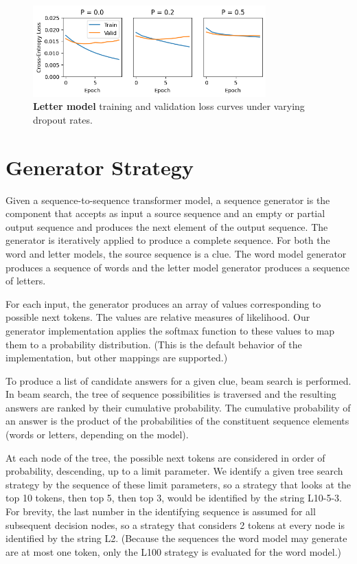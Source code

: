 \documentclass[letterpaper]{article} %
\begin{document}
\begin{NoHyper}
\begin{figure}
\centering
\includegraphics[width=0.8\textwidth]{fig-charmark-loss-dropout}
\caption{\textbf{Letter model} training and validation loss curves under varying dropout rates.}
\label{fig:charmark-loss-dropout}
\end{figure}



\section{Generator Strategy}
\label{sec:generator}

Given a sequence-to-sequence transformer model, a sequence generator is the component that accepts as input a source sequence and an empty or partial output sequence and produces the next element of the output sequence. The generator is iteratively applied to produce a complete sequence. For both the word and letter models, the source sequence is a clue. The word model generator produces a sequence of words and the letter model generator produces a sequence of letters.

For each input, the generator produces an array of values corresponding to possible next tokens. The values are relative measures of likelihood. Our generator implementation applies the softmax function to these values to map them to a probability distribution. (This is the default behavior of the implementation, but other mappings are supported.)

To produce a list of candidate answers for a given clue, beam search is performed. In beam search, the tree of sequence possibilities is traversed and the resulting answers are ranked by their cumulative probability. The cumulative probability of an answer is the product of the probabilities of the constituent sequence elements (words or letters, depending on the model).

At each node of the tree, the possible next tokens are considered in order of probability, descending, up to a limit parameter.
We identify a given tree search strategy by the sequence of these limit parameters, so a strategy that looks at the top 10 tokens, then top 5, then top 3, would be identified by the string L10-5-3.
For brevity, the last number in the identifying sequence is assumed for all subsequent decision nodes, so a strategy that considers 2 tokens at every node is identified by the string L2. (Because the sequences the word model may generate are at most one token, only the L100 strategy is evaluated for the word model.)


\end{NoHyper}
\end{document}
